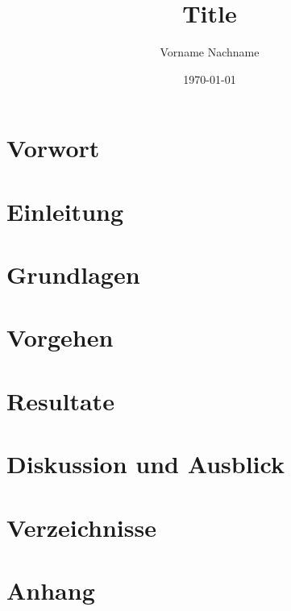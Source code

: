 \documentclass[a4paper, 11pt,abstract=on]{scrreprt}
\title{Title}
\author{Vorname Nachname}
\date{\today}
\begin{document}


\clearpage
\setcounter{page}{1}




\begin{abstract}

\end{abstract}
\begin{abstract}

\end{abstract}

\chapter*{Vorwort}


\tableofcontents

\chapter{Einleitung}


\chapter{Grundlagen}


\chapter{Vorgehen}


\chapter{Resultate}


\chapter{Diskussion und Ausblick}


\chapter{Verzeichnisse}


\appendix
\chapter{Anhang}
\label{ch:anhang}

\end{document}

